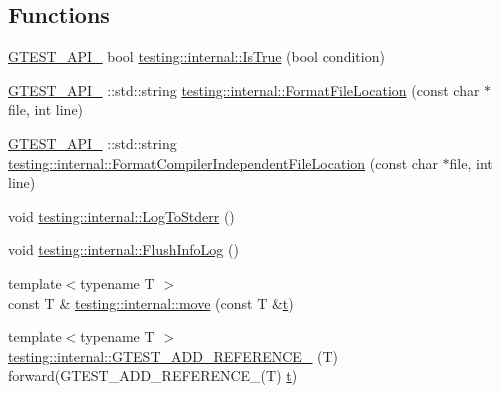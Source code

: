 \subsection*{Functions}
\begin{DoxyCompactItemize}
\item 
\mbox{\hyperlink{_obj__test_2lib_2googletest-release-1_88_81_2googletest_2include_2gtest_2internal_2gtest-port_8h_aa73be6f0ba4a7456180a94904ce17790}{G\+T\+E\+S\+T\+\_\+\+A\+P\+I\+\_\+}} bool \mbox{\hyperlink{namespacetesting_1_1internal_a527b9bcc13669b9a16400c8514266254}{testing\+::internal\+::\+Is\+True}} (bool condition)
\item 
\mbox{\hyperlink{_obj__test_2lib_2googletest-release-1_88_81_2googletest_2include_2gtest_2internal_2gtest-port_8h_aa73be6f0ba4a7456180a94904ce17790}{G\+T\+E\+S\+T\+\_\+\+A\+P\+I\+\_\+}} \+::std\+::string \mbox{\hyperlink{namespacetesting_1_1internal_a31b7c3abed4a7c395f42c61e993989f4}{testing\+::internal\+::\+Format\+File\+Location}} (const char $\ast$file, int line)
\item 
\mbox{\hyperlink{_obj__test_2lib_2googletest-release-1_88_81_2googletest_2include_2gtest_2internal_2gtest-port_8h_aa73be6f0ba4a7456180a94904ce17790}{G\+T\+E\+S\+T\+\_\+\+A\+P\+I\+\_\+}} \+::std\+::string \mbox{\hyperlink{namespacetesting_1_1internal_a1ee4cde97868c53e442d3182496a9f3c}{testing\+::internal\+::\+Format\+Compiler\+Independent\+File\+Location}} (const char $\ast$file, int line)
\item 
void \mbox{\hyperlink{namespacetesting_1_1internal_a06b1b20029fbd1dbeb59752f914fab84}{testing\+::internal\+::\+Log\+To\+Stderr}} ()
\item 
void \mbox{\hyperlink{namespacetesting_1_1internal_a2135f223bf6b527729aeaa651115183b}{testing\+::internal\+::\+Flush\+Info\+Log}} ()
\item 
{\footnotesize template$<$typename T $>$ }\\const T \& \mbox{\hyperlink{namespacetesting_1_1internal_a0f6d06bf8c3093b9c22bb08723db201e}{testing\+::internal\+::move}} (const T \&\mbox{\hyperlink{_mutual_8h_a978d88b393c8a37dc2614c88788b3442}{t}})
\item 
{\footnotesize template$<$typename T $>$ }\\\mbox{\hyperlink{namespacetesting_1_1internal_a3b78178c942d020bb164d80d8c778bff}{testing\+::internal\+::\+G\+T\+E\+S\+T\+\_\+\+A\+D\+D\+\_\+\+R\+E\+F\+E\+R\+E\+N\+C\+E\+\_\+}} (T) forward(G\+T\+E\+S\+T\+\_\+\+A\+D\+D\+\_\+\+R\+E\+F\+E\+R\+E\+N\+C\+E\+\_\+(T) \mbox{\hyperlink{_mutual_8h_a978d88b393c8a37dc2614c88788b3442}{t}})

\end{DoxyCompactItemize}
